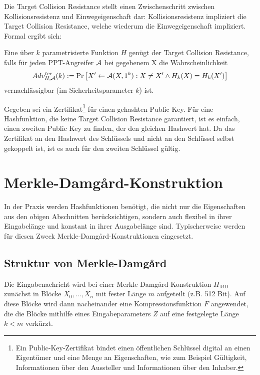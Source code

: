 Die Target Collision Resistance stellt einen Zwischenschritt zwischen Kollisionsresistenz und Einwegeigenschaft dar: Kollisionsresistenz impliziert die
Target Collision Resistance, welche wiederum die Einwegeigenschaft impliziert. Formal ergibt sich:\\

\begin{definition}
Eine über $k$ parametrisierte Funktion $H$ genügt der Target Collision Resistance, falls für jeden PPT-Angreifer $\mathcal{A}$ bei gegebenem X die Wahrscheinlichkeit
\begin{equation*}
Adv^{tcr}_{H,\mathcal{A}}(k):= \Pr \left[ X' \leftarrow \mathcal{A}(X, 1^k) : X \neq X' \land H_k(X) = H_k(X')\right]
\end{equation*}
vernachlässigbar (im Sicherheitsparameter $k$) ist.
\end{definition}

\begin{beispiel}
Gegeben sei ein Zertifikat\footnote{Ein Public-Key-Zertifikat bindet einen öffentlichen Schlüssel digital an einen Eigentümer und eine Menge an Eigenschaften, wie
zum Beispiel Gültigkeit, Informationen über den Aussteller und Informationen über den Inhaber.} für einen  gehashten Public Key. Für eine Hashfunktion,
die keine Target Collision Resistance garantiert, ist es einfach, einen zweiten Public Key zu finden, der den gleichen Hashwert hat. Da das Zertifikat an den
Hashwert des Schlüssels und nicht an den Schlüssel selbst gekoppelt ist, ist es auch für den zweiten Schlüssel gültig.
\end{beispiel}

\section{Merkle-Damgård-Konstruktion}
\label{ch:hash:merkledamgard}
In der Praxis werden Hashfunktionen benötigt, die nicht nur die Eigenschaften aus den obigen Abschnitten berücksichtigen, sondern auch flexibel in ihrer
Eingabelänge und konstant in ihrer Ausgabelänge sind. Typischerweise werden für diesen Zweck Merkle-Damgård-Konstruktionen eingesetzt. 

\subsection{Struktur von Merkle-Damgård}
Die Eingabenachricht wird bei einer Merkle-Damgård-Konstruktion $H_{MD}$ zunächst in Blöcke $X_0, \ldots , X_n$ mit fester Länge $m$ aufgeteilt (z.B. 512 Bit).
Auf diese Blöcke wird dann nacheinander eine Kompressionsfunktion $F$ angewendet, die die Blöcke mithilfe eines Eingabeparameters $Z$ auf eine festgelegte Länge
$k < m$ verkürzt.

